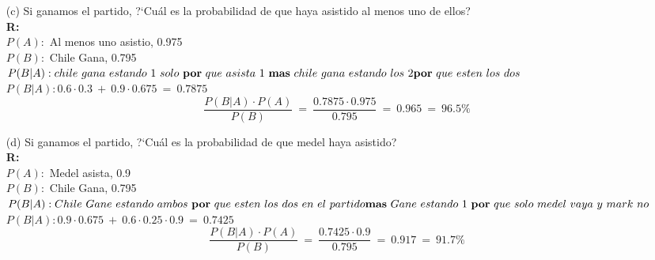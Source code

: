 \begin{itemize}
	\item[(c)] Si ganamos el partido, ?`Cu\'al es la probabilidad de que haya asistido al menos uno de ellos?\\
		\textbf{R:}\\
		$P(A):$ Al menos uno asistio, 0.975\\
		$P(B):$ Chile Gana, 0.795\\
		$P(B|A): chile\ gana\ estando\ 1\ solo\ \textbf{por}\ que\ asista\ 1\ \textbf{mas}\ chile\ gana\ estando\ los\ 2\\ \textbf{por}\ que\ esten\ los\ dos$\\
		$P(B|A): 0.6\cdot 0.3\ +\ 0.9\cdot 0.675\ =\ 0.7875$
		$$\frac{P(B|A)\cdot P(A)}{P(B)}\ =\ \frac{0.7875\cdot 0.975}{0.795}\ =\ 0.965\ =\ 96.5\%$$
	\item[(d)] Si ganamos el partido, ?`Cu\'al es la probabilidad de que medel haya asistido?\\
		\textbf{R:}\\
		$P(A):$ Medel asista, 0.9\\
		$P(B):$ Chile Gana, 0.795\\
		$P(B|A): Chile\ Gane\ estando\ ambos\ \textbf{por}\ que\ esten\ los\ dos\ en\ el\ partido\\ \textbf{mas}\ Gane\ estando\ 1\ \textbf{por}\ que\ solo\ medel\ vaya\ y\ mark\ no$
		$P(B|A):0.9\cdot 0.675\ +\ 0.6\cdot 0.25\cdot 0.9\ =\ 0.7425$\\
		$$\frac{P(B|A)\cdot P(A)}{P(B)}\ =\ \frac{0.7425\cdot 0.9}{0.795}\ =\ 0.917\ =\ 91.7\%$$
\end{itemize}
